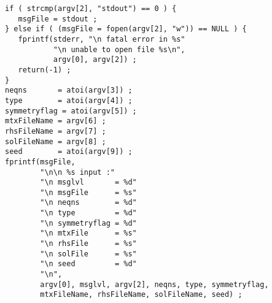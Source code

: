 \begin{verbatim}
if ( strcmp(argv[2], "stdout") == 0 ) {
   msgFile = stdout ;
} else if ( (msgFile = fopen(argv[2], "w")) == NULL ) {
   fprintf(stderr, "\n fatal error in %s"
           "\n unable to open file %s\n",
           argv[0], argv[2]) ;
   return(-1) ;
}
neqns       = atoi(argv[3]) ;
type        = atoi(argv[4]) ;
symmetryflag = atoi(argv[5]) ;
mtxFileName = argv[6] ;
rhsFileName = argv[7] ;
solFileName = argv[8] ;
seed        = atoi(argv[9]) ;
fprintf(msgFile, 
        "\n\n %s input :"
        "\n msglvl       = %d"
        "\n msgFile      = %s"
        "\n neqns        = %d"
        "\n type         = %d"
        "\n symmetryflag = %d"
        "\n mtxFile      = %s"
        "\n rhsFile      = %s"
        "\n solFile      = %s"
        "\n seed         = %d"
        "\n",
        argv[0], msglvl, argv[2], neqns, type, symmetryflag,
        mtxFileName, rhsFileName, solFileName, seed) ;


\end{verbatim}
